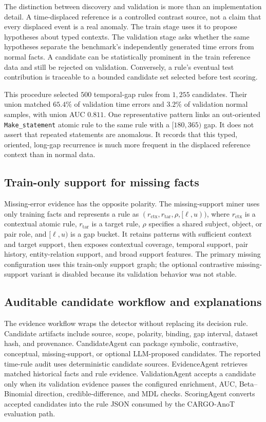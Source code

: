 The distinction between discovery and validation is more than an implementation detail. A time-displaced reference is a controlled contrast source, not a claim that every displaced event is a real anomaly. The train stage uses it to propose hypotheses about typed contexts. The validation stage asks whether the same hypotheses separate the benchmark's independently generated time errors from normal facts. A candidate can be statistically prominent in the train reference data and still be rejected on validation. Conversely, a rule's eventual test contribution is traceable to a bounded candidate set selected before test scoring.

This procedure selected $500$ temporal-gap rules from $1{,}255$ candidates. Their union matched $65.4\%$ of validation time errors and $3.2\%$ of validation normal samples, with union AUC $0.811$. One representative pattern links an out-oriented \texttt{Make\_statement} atomic rule to the same rule with a $[180,365)$ gap. It does not assert that repeated statements are anomalous. It records that this typed, oriented, long-gap recurrence is much more frequent in the displaced reference context than in normal data.

\subsection{Train-only support for missing facts}

Missing-error evidence has the opposite polarity. The missing-support miner uses only training facts and represents a rule as $(r_{\mathrm{ctx}},r_{\mathrm{tar}},\rho,[\ell,u))$, where $r_{\mathrm{ctx}}$ is a contextual atomic rule, $r_{\mathrm{tar}}$ is a target rule, $\rho$ specifies a shared subject, object, or pair role, and $[\ell,u)$ is a gap bucket. It retains patterns with sufficient context and target support, then exposes contextual coverage, temporal support, pair history, entity-relation support, and broad support features. The primary missing configuration uses this train-only support graph; the optional contrastive missing-support variant is disabled because its validation behavior was not stable.

\subsection{Auditable candidate workflow and explanations}

The evidence workflow wraps the detector without replacing its decision rule. Candidate artifacts include source, scope, polarity, binding, gap interval, dataset hash, and provenance. CandidateAgent can package symbolic, contrastive, conceptual, missing-support, or optional LLM-proposed candidates. The reported time-rule audit uses deterministic candidate sources. EvidenceAgent retrieves matched historical facts and rule evidence. ValidationAgent accepts a candidate only when its validation evidence passes the configured enrichment, AUC, Beta--Binomial direction, credible-difference, and MDL checks. ScoringAgent converts accepted candidates into the rule JSON consumed by the CARGO-AnoT evaluation path.


